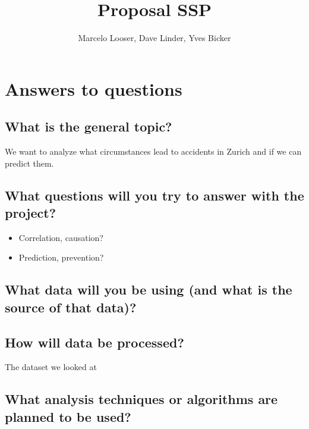 \documentclass{article}
\title{Proposal SSP}
\author{Marcelo Looser, Dave Linder, Yves Bicker}
\begin{document}
\maketitle

\section{Answers to questions}

\subsection{What is the general topic?}
We want to analyze what circumstances lead to accidents in Zurich and if we can predict them. 
\subsection{What questions will you try to answer with the project?}
\begin{itemize}
    \item Correlation, causation?
    \item Prediction, prevention?
\end{itemize}
\subsection{What data will you be using (and what is the source of that data)?}

\subsection{How will data be processed?}
The dataset we looked at 
\subsection{What analysis techniques or algorithms are planned to be used?}
\end{document}
